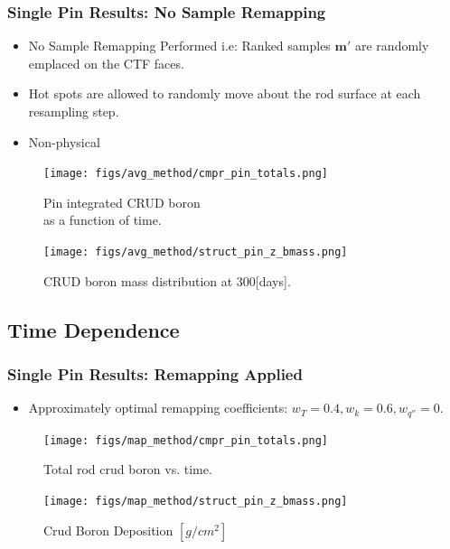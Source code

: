 \documentclass[t, pdftex]{beamer}
\begin{document}
\begin{frame}
\frametitle{Single Pin Results: No Sample Remapping}
\vspace{-16pt}
\scriptsize{
\begin{itemize}
    \item No Sample Remapping Performed i.e:
    Ranked samples $\mathbf m'$ are randomly emplaced on the CTF faces.
    \item Hot spots are allowed to randomly move about the rod surface at each resampling step.
    \item Non-physical
\end{itemize}
}
\begin{figure}[!htbp]
    \centering
    \begin{minipage}{.5\textwidth}
        \texttt{[image: figs/avg\_method/cmpr\_pin\_totals.png]}
        \caption{\centering Pin integrated CRUD boron \\ as a function of time.} 
        \label{fig:crud_pre_map}
    \end{minipage}%
    \begin{minipage}{.5\textwidth}
        \texttt{[image: figs/avg\_method/struct\_pin\_z\_bmass.png]}
        \caption{\centering CRUD boron mass distribution at 300[days].}
        \label{fig:crud_post_map}
    \end{minipage}
\end{figure}
\end{frame}

\subsection*{Time Dependence}
\begin{frame}
\frametitle{Single Pin Results:  Remapping Applied}
\begin{itemize}
    \item Approximately optimal remapping coefficients: $w_T=0.4, w_k=0.6, w_{q''}=0$. 
\end{itemize}
    \begin{figure}
        \centering
        \begin{minipage}{.5\textwidth}
            \centering
            \texttt{[image: figs/map\_method/cmpr\_pin\_totals.png]}
            \caption{\centering Total rod crud boron vs. time.}
        \end{minipage}%
        \begin{minipage}{.5\textwidth}
            \centering
            \texttt{[image: figs/map\_method/struct\_pin\_z\_bmass.png]}
            \caption{ \centering Crud Boron Deposition $[g/cm^2]$}
        \end{minipage}
    \end{figure} 
\end{frame}
\end{document}
